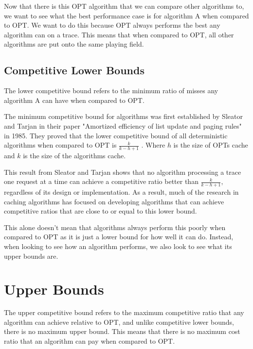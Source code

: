 Now that there is this OPT algorithm that we can compare other algorithms to, we want to see what the best performance case is for algorithm A when compared to OPT. We want to do this because OPT always performs the best any algorithm can on a trace. This means that when compared to OPT, all other algorithms are put onto the same playing field.


\hfill \break
\hfill \break
\hfill \break
\hfill \break
\hfill \break
\hfill \break
\hfill \break
\hfill \break
\hfill \break
\hfill \break




\subsection{Competitive Lower Bounds}
The lower competitive bound refers to the minimum ratio of misses any algorithm A can have when compared to OPT.

The minimum competitive bound for algorithms was first established by Sleator and Tarjan in their paper "Amortized efficiency of list update and paging rules" in 1985. They proved that the lower competitive bound of all deterministic algorithms when compared to OPT is $\frac{k}{k-h+1}$ \cite{sleator1985amortized}. Where $h$ is the size of OPTs cache and $k$ is the size of the algorithms cache.

This result from Sleator and Tarjan shows that no algorithm processing a trace one request at a time can achieve a competitive ratio better than $\frac{k}{k-h+1}$, regardless of its design or implementation. As a result, much of the research in caching algorithms has focused on developing algorithms that can achieve competitive ratios that are close to or equal to this lower bound.

This alone doesn't mean that algorithms always perform this poorly when compared to OPT as it is just a lower bound for how well it can do. Instead, when looking to see how an algorithm performs, we also look to see what its upper bounds are.



\section{Upper Bounds}
The upper competitive bound refers to the maximum competitive ratio that any algorithm can achieve relative to OPT, and unlike competitive lower bounds, there is no maximum upper bound. This means that there is no maximum cost ratio that an algorithm can pay when compared to OPT.

